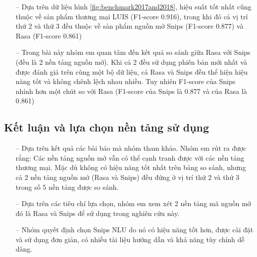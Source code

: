 \begin{itemize}
    \item[--] Dựa trên dữ liệu hình \ref{fig:benchmark2017and2018}, hiệu suất tốt nhất cũng thuộc về sản phẩm thương mại LUIS (F1-score 0.916), trong khi đó cả vị trí thứ 2 và thứ 3 đều thuộc về sản phẩm nguồn mở Snips (F1-score 0.877) và Rasa  (F1-score 0.861)
    \item[--] Trong bài này nhóm em quan tâm đến kết quả so sánh giữa Rasa với Snips (đều là 2 nền tảng nguồn mở). Khi cả 2 đều sử dụng phiên bản mới nhất và được đánh giá trên cùng một bộ dữ liệu, cả Rasa và Snips đều thể hiện hiệu năng tốt và không chênh lệch nhau nhiều. Tuy nhiên F1-score của Snips nhỉnh hơn một chút so với Rasa (F1-score của Snips là 0.877 và của Rasa là 0.861)
\end{itemize}

\subsection{Kết luận và lựa chọn nền tảng sử dụng}

\begin{itemize}
    \item[--] Dựa trên kết quả các bài báo mà nhóm tham khảo. Nhóm em rút ra được rằng: Các nền tảng nguồn mở vẫn có thể cạnh tranh được với các nền tảng thương mại. Mặc dù không có hiệu năng tốt nhất trên bảng so sánh, nhưng cả 2 nền tảng nguồn mở (Rasa và Snips) đều đứng ở vị trí thứ 2 và thứ 3 trong số 5 nền tảng được so sánh.
    \item[--] Dựa trên các tiêu chí lựa chọn, nhóm em xem xét 2 nền tảng mã nguồn mở đó là Rasa và Snips để sử dụng trong nghiên cứu này. 
    \item[--] Nhóm quyết định chọn Snips NLU do nó có hiệu năng tốt hơn, được cài đặt và sử dụng đơn giản, có nhiều tài liệu hướng dẫn và khả năng tùy chỉnh dễ dàng.
\end{itemize}